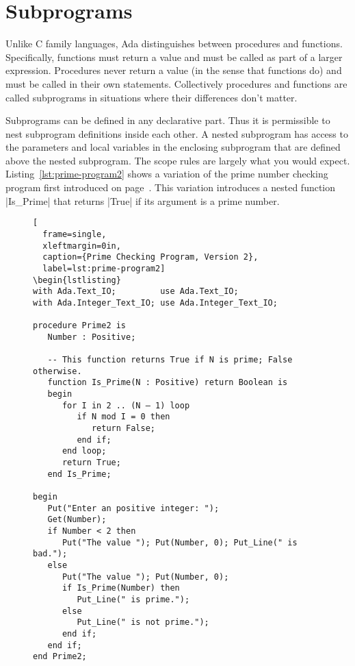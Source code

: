 \section{Subprograms}

Unlike C family languages, Ada distinguishes between procedures and functions. Specifically,
functions must return a value and must be called as part of a larger expression. Procedures
never return a value (in the sense that functions do) and must be called in their own
statements. Collectively procedures and functions are called subprograms in situations where
their differences don't matter.

Subprograms can be defined in any declarative part. Thus it is permissible to nest subprogram
definitions inside each other. A nested subprogram has access to the parameters and local
variables in the enclosing subprogram that are defined above the nested subprogram. The scope
rules are largely what you would expect. Listing~\ref{lst:prime-program2} shows a variation of
the prime number checking program first introduced on page~\pageref{lst:prime-program}. This
variation introduces a nested function |Is_Prime| that returns |True| if its argument is a prime
number.

\begin{figure}[tbhp]
\begin{lstlisting}[
  frame=single,
  xleftmargin=0in,
  caption={Prime Checking Program, Version 2},
  label=lst:prime-program2]
\begin{lstlisting}
with Ada.Text_IO;         use Ada.Text_IO;
with Ada.Integer_Text_IO; use Ada.Integer_Text_IO;

procedure Prime2 is
   Number : Positive;

   -- This function returns True if N is prime; False otherwise.
   function Is_Prime(N : Positive) return Boolean is
   begin
      for I in 2 .. (N – 1) loop
         if N mod I = 0 then
            return False;
         end if;
      end loop;
      return True;
   end Is_Prime;

begin
   Put("Enter an positive integer: ");
   Get(Number);
   if Number < 2 then
      Put("The value "); Put(Number, 0); Put_Line(" is bad.");
   else
      Put("The value "); Put(Number, 0);
      if Is_Prime(Number) then
         Put_Line(" is prime.");
      else
         Put_Line(" is not prime.");
      end if;
   end if;
end Prime2;
\end{lstlisting}
\end{figure}

